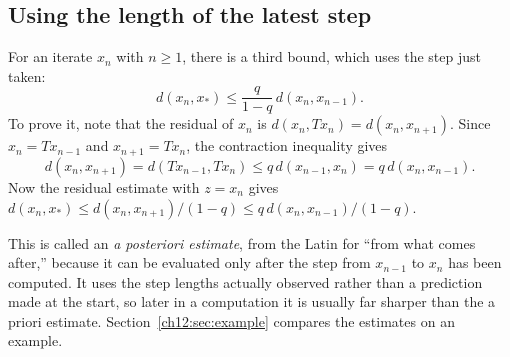 \subsection*{Using the length of the latest step}
For an iterate $x_n$ with $n\ge1$, there is a third bound, which uses the step just taken:
\[
d(x_n,x_*)\le\frac{q}{1-q}\,d(x_n,x_{n-1}).
\]
To prove it, note that the residual of $x_n$ is $d(x_n,Tx_n)=d(x_n,x_{n+1})$. Since $x_n=Tx_{n-1}$ and $x_{n+1}=Tx_n$, the contraction inequality gives
\[
d(x_n,x_{n+1})=d(Tx_{n-1},Tx_n)\le q\,d(x_{n-1},x_n)=q\,d(x_n,x_{n-1}).
\]
Now the residual estimate with $z=x_n$ gives $d(x_n,x_*)\le d(x_n,x_{n+1})/(1-q)\le q\,d(x_n,x_{n-1})/(1-q)$.

This is called an \emph{a posteriori estimate}, from the Latin for ``from what comes after,'' because it can be evaluated only after the step from $x_{n-1}$ to $x_n$ has been computed. It uses the step lengths actually observed rather than a prediction made at the start, so later in a computation it is usually far sharper than the a priori estimate. Section~\ref{ch12:sec:example} compares the estimates on an example.

